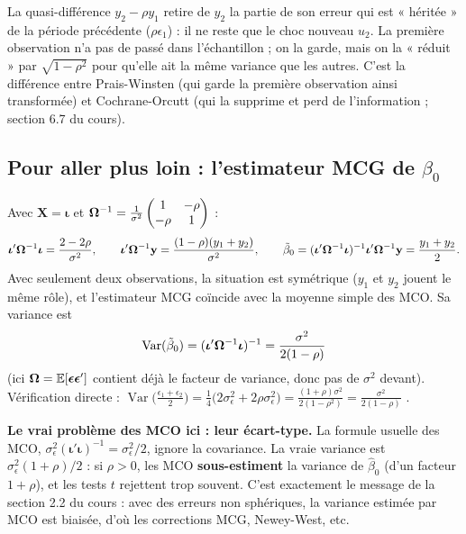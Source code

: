 \documentclass[11pt,a4paper]{article}
\newcommand{\vy}{\mathbf{y}}\newcommand{\vX}{\mathbf{X}}\newcommand{\vi}{\bm{\iota}}
\newcommand{\veps}{\bm{\epsilon}}\newcommand{\vu}{\mathbf{u}}\newcommand{\vbeta}{\bm{\beta}}
\newcommand{\E}{\mathbb{E}}\newcommand{\Var}{\operatorname{Var}}\newcommand{\Cov}{\operatorname{Cov}}
\begin{document}
\begin{intuition}
La quasi-différence $y_2-\rho y_1$ retire de $y_2$ la partie de son erreur qui est « héritée » de la période précédente ($\rho\epsilon_1$) : il ne reste que le choc nouveau $u_2$. La première observation n'a pas de passé dans l'échantillon ; on la garde, mais on la « réduit » par $\sqrt{1-\rho^2}$ pour qu'elle ait la même variance que les autres. C'est la différence entre Prais-Winsten (qui garde la première observation ainsi transformée) et Cochrane-Orcutt (qui la supprime et perd de l'information ; section 6.7 du cours).
\end{intuition}

\subsection*{Pour aller plus loin : l'estimateur MCG de $\beta_0$}

Avec $\vX=\vi$ et $\bm{\Omega}^{-1}=\frac1{\sigma^2}\begin{pmatrix}1&-\rho\\-\rho&1\end{pmatrix}$ :
\[
\vi'\Om^{-1}\vi=\frac{2-2\rho}{\sigma^2},\qquad
\vi'\Om^{-1}\vy=\frac{(1-\rho)(y_1+y_2)}{\sigma^2},\qquad
\tilde\beta_0=(\vi'\Om^{-1}\vi)^{-1}\vi'\Om^{-1}\vy=\frac{y_1+y_2}{2}.
\]
Avec seulement deux observations, la situation est symétrique ($y_1$ et $y_2$ jouent le même rôle), et l'estimateur MCG coïncide avec la moyenne simple des MCO. Sa variance est
\[
\Var(\tilde\beta_0)=(\vi'\Om^{-1}\vi)^{-1}=\frac{\sigma^2}{2(1-\rho)}
\]
(ici $\Om=\E[\veps\veps']$ contient déjà le facteur de variance, donc pas de $\sigma^2$ devant).
Vérification directe : $\Var\big(\frac{\epsilon_1+\epsilon_2}{2}\big)=\frac14\big(2\sigma_\epsilon^2+2\rho\sigma_\epsilon^2\big)=\frac{(1+\rho)\sigma^2}{2(1-\rho^2)}=\frac{\sigma^2}{2(1-\rho)}$ \checkmark.

\textbf{Le vrai problème des MCO ici : leur écart-type.} La formule usuelle des MCO, $\sigma_\epsilon^2(\vi'\vi)^{-1}=\sigma_\epsilon^2/2$, ignore la covariance. La vraie variance est $\sigma_\epsilon^2(1+\rho)/2$ : si $\rho>0$, les MCO \textbf{sous-estiment} la variance de $\hat\beta_0$ (d'un facteur $1+\rho$), et les tests $t$ rejettent trop souvent. C'est exactement le message de la section 2.2 du cours : avec des erreurs non sphériques, la variance estimée par MCO est biaisée, d'où les corrections MCG, Newey-West, etc.
\end{document}
